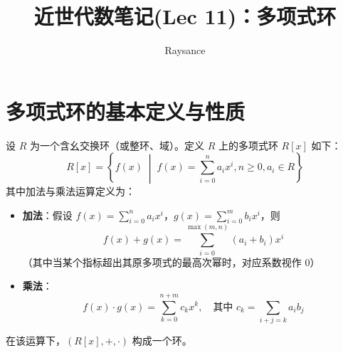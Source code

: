 \documentclass[11pt]{article}
\title{近世代数笔记(Lec 11)：多项式环}
\author{Raysance}
\date{}
\begin{document}
\maketitle

\section{多项式环的基本定义与性质}

\begin{cndefinition}[多项式与多项式环]
设 $R$ 为一个含幺交换环（或整环、域）。定义 $R$ 上的多项式环 $R[x]$ 如下：
$$ R[x] = \left\{ f(x) \;\middle|\; f(x) = \sum_{i=0}^n a_i x^i, n \ge 0, a_i \in R \right\} $$
其中加法与乘法运算定义为：
\begin{itemize}
    \item \textbf{加法}：假设 $f(x) = \sum_{i=0}^n a_i x^i$，$g(x) = \sum_{i=0}^m b_i x^i$，则
    $$ f(x) + g(x) = \sum_{i=0}^{\max(m,n)} (a_i + b_i)x^i $$
    （其中当某个指标超出其原多项式的最高次幂时，对应系数视作 $0$）
    \item \textbf{乘法}：
    $$ f(x) \cdot g(x) = \sum_{k=0}^{n+m} c_k x^k, \quad \text{其中 } c_k = \sum_{i+j=k} a_i b_j $$
\end{itemize}
在该运算下，$(R[x], +, \cdot)$ 构成一个环。
\end{cndefinition}
\end{document}
